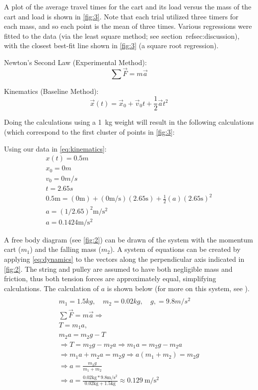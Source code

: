 \documentclass[reprint,amsmath,amssymb,aps]{revtex4-2}
\begin{document}
A plot of the average travel times for the cart and its load versus the mass of the cart and load is shown in \cref{fig:3}. Note that each trial utilized three timers for each mass, and so each point is the mean of three times. Various regressions were fitted to the data (via the least square method; see section~ref{sec:discussion}), with the closest best-fit line shown in \cref{fig:3} (a square root regression).

Newton's Second Law (Experimental Method): 
\begin{equation} 
    \sum\vec{F} = m\vec{a}
    \label{eq:dynamics}
\end{equation}

 Kinematics (Baseline Method): 
\begin{equation} 
    \vec{x}(t) = \vec{x}_0 + \vec{v}_0t + \frac{1}{2}\vec{a} t^2
    \label{eq:kinematics}
\end{equation}

Doing the calculations using a \qty{1}{\kilo\gram} weight will result in the following calculations (which correspond to the first cluster of points in \cref{fig:3}:

Using our data in \cref{eq:kinematics}: 
\begin{gather*}
    x(t) = 0.5m
    \\x_0 = 0m
    \\v_0 = 0m/s
    \\t = 2.65s
    \\0.5\text{m} = (0\text{m}) + (0\text{m/s})(2.65\text{s})+\frac{1}{2}(a)(2.65\text{s})^2
    \\a = (1/2.65)^2\text{m}/\text{s}^2
    \\a = 0.1424\text{m}/\text{s}^2
\end{gather*}

A free body diagram (see \cref{fig:2}) can be drawn of the system with the momentum cart ($m_1$) and the falling mass ($m_2$). A system of equations can be created by applying \cref{eq:dynamics} to the vectors along the perpendicular axis indicated in \cref{fig:2}. The string and pulley are assumed to have both negligible mass and friction, thus both tension forces are approximately equal, simplifying calculations. The calculation of $a$ is shown below (for more on this system, see \cite{tipler}).
\begin{gather*}
     \\m_1 = 1.5 kg, \quad m_2 = 0.02kg, \quad g , = 9.8m/s^2
    \\ \sum\vec{F}=m\vec{a}\Rightarrow
    \\T = m_1a, \tag{5}
    \\m_2a = m_2g - T \tag{6}
    \\ \Rightarrow T = m_2g - m_2a \Rightarrow m_1a =  m_2g - m_2a
    \\ \Rightarrow m_1a + m_2a = m_2g \Rightarrow a(m_1 + m_2) = m_2g 
    \\ \Rightarrow a = \frac{m_2g}{m_1 + m_2} \tag{7}
    \\ \Rightarrow a = \frac{0.02\text{kg}*9.8\text{m}/\text{s}^2}{0.02\text{kg}+1.5\text{kg}} \approx \qty{0.129}{\meter\per\second\squared} 
\end{gather*}
\end{document}
